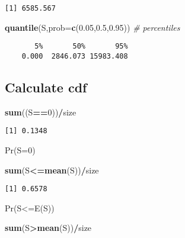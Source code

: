 \documentclass[]{book}
\newenvironment{Shaded}{\begin{snugshade}}{\end{snugshade}}
\newcommand{\KeywordTok}[1]{\textcolor[rgb]{0.13,0.29,0.53}{\textbf{#1}}}
\newcommand{\DataTypeTok}[1]{\textcolor[rgb]{0.13,0.29,0.53}{#1}}
\newcommand{\DecValTok}[1]{\textcolor[rgb]{0.00,0.00,0.81}{#1}}
\newcommand{\FloatTok}[1]{\textcolor[rgb]{0.00,0.00,0.81}{#1}}
\newcommand{\CommentTok}[1]{\textcolor[rgb]{0.56,0.35,0.01}{\textit{#1}}}
\newcommand{\OperatorTok}[1]{\textcolor[rgb]{0.81,0.36,0.00}{\textbf{#1}}}
\newcommand{\NormalTok}[1]{#1}
\theoremstyle{definition}
\theoremstyle{definition}
\theoremstyle{definition}
\theoremstyle{remark}
\begin{document}
\begin{verbatim}
[1] 6585.567
\end{verbatim}

\begin{Shaded}
\begin{Highlighting}[]
\KeywordTok{quantile}\NormalTok{(S,}\DataTypeTok{prob=}\KeywordTok{c}\NormalTok{(}\FloatTok{0.05}\NormalTok{,}\FloatTok{0.5}\NormalTok{,}\FloatTok{0.95}\NormalTok{))   }\CommentTok{# percentiles}
\end{Highlighting}
\end{Shaded}

\begin{verbatim}
       5%       50%       95% 
    0.000  2846.073 15983.408 
\end{verbatim}

\subsection{Calculate cdf}\label{calculate-cdf}

\begin{Shaded}
\begin{Highlighting}[]
\KeywordTok{sum}\NormalTok{((S}\OperatorTok{==}\DecValTok{0}\NormalTok{))}\OperatorTok{/}\NormalTok{size}
\end{Highlighting}
\end{Shaded}

\begin{verbatim}
[1] 0.1348
\end{verbatim}

Pr(S=0)

\begin{Shaded}
\begin{Highlighting}[]
\KeywordTok{sum}\NormalTok{(S}\OperatorTok{<=}\KeywordTok{mean}\NormalTok{(S))}\OperatorTok{/}\NormalTok{size}
\end{Highlighting}
\end{Shaded}

\begin{verbatim}
[1] 0.6578
\end{verbatim}

Pr(S\textless{}=E(S))

\begin{Shaded}
\begin{Highlighting}[]
\KeywordTok{sum}\NormalTok{(S}\OperatorTok{>}\KeywordTok{mean}\NormalTok{(S))}\OperatorTok{/}\NormalTok{size }
\end{Highlighting}
\end{Shaded}
\end{document}

